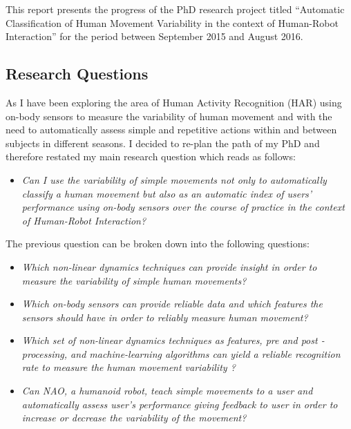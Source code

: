 \documentclass[9pt,journal,onecolumn,compsoc]{IEEEtran}
\begin{document}


This report presents the progress of the PhD research project titled
``Automatic Classification of Human Movement Variability in the context of Human-Robot Interaction'' 
for the period between September 2015 and August 2016.


\subsection{Research Questions}
As 
I have been exploring the area of Human Activity Recognition (HAR)
using on-body sensors to measure the variability of human movement 
and 
with the need to automatically assess simple and repetitive actions 
within and between subjects in different seasons.
I decided to re-plan the path of my PhD and therefore restated my main research question which reads as follows:
\begin{itemize}
 \item \textit{Can I use the variability of simple movements not only to automatically classify
 a human movement but also as an automatic index of users' performance using on-body sensors 
over the course of practice in the context
of Human-Robot Interaction?}
\end{itemize}
The previous question can be broken down into the following questions:
\begin{itemize}
 \item \textit{Which non-linear dynamics  techniques can provide insight in order to measure 
 the variability of simple human movements?}
 
 \item \textit{Which on-body sensors can provide reliable data 
 and which features the sensors should have in order to reliably measure human movement?}
 
 \item \textit{Which set of 
 non-linear dynamics techniques as features, 
 pre and post -processing, and machine-learning algorithms 
  can yield a reliable recognition rate to measure the human movement variability
  ?}
 
 \item \textit{Can NAO, a humanoid robot, 
 teach simple movements to a user and automatically assess user's performance 
 giving feedback to user in order to increase or decrease the variability of the movement?}
 
\end{itemize}
\end{document}
